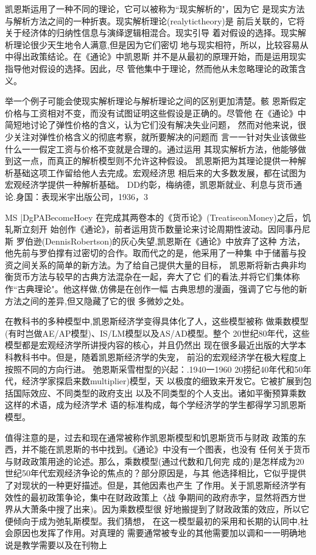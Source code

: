 凯恩斯运用了一种不同的理论，它可以被称为“现实解析的"，因为它
是现实方法与解析方法之间的一种折衷。现实解析理论(realytictheory)是
前后关联的，它将关于经济体的归纳性信息与演绎逻辑相混合。现实引导
着对假设的选择。现实解析理论很少天生地令人满意,但是因为它们密切
地与现实相符，所以，比较容易从中得出政策结论。在《通论》中凯恩斯
并不是从最初的原理开始，而是运用现实指导他对假设的选择。因此，尽
管他集中于理论，然而他从未忽略理论的政策含义。

举一个例子可能会使现实解析理论与解析理论之间的区别更加清楚。骸
恩斯假定价格与工资相对不变，而没有试图证明这些假设是正确的。尽管他
在《通论》中简短地讨论了弹性价格的含义，认为它们没有解决失业问题，
然而对他来说，很少关注对弹性价格含义的彻底考察，就所要解决的问题而
言一一针对失业该做些什么一一假定工资与价格不变就是合理的。通过运用
其现实解析方法，他能够做到这一点，而真正的解析模型则不允许这种假设。
凯恩斯把为其理论提供一种解析基础这项工作留给他人去完成。宏观经济思
相后来的大多数发展，都在试图为宏观经济学提供一种解析基础。
DD约彰，梅纳德，凯恩斯就业、利息与货币通论.身国：表现米宇出版公司，1936，3

MS
|DgPABecomeHoey
在完成其两卷本的《货币论》(TreatiseonMoney)之后，饥轧斯立刻开
始创作《通论》，前者运用货币数量论来讨论周期性波动。因同事丹尼斯
罗伯逊(DennisRobertson)的灰心失望,凯恩斯在《通论》中放弃了这种
方法，他先前与罗伯撑有过密切的合作。取而代之的是，他采用了一种集
中于储蓄与投资之间关系的简单的新方法。为了给自己提供大量的目标，
凯恩斯将新古典非均衡货币方法与较早的古典方法混杂在一起，奔大了它
们的看法,并将它们集体称作“古典理论"。他这样做,仿佛是在创作一幅
古典思想的漫画，强调了它与他的新方法之间的差异,但又隐藏了它的很
多微妙之处。

在教科书的多种模型中,凯恩斯经济学变得具体化了人，这些模型被称
做乘数模型(有时岂做AE/AP模型)、IS/LM模型以及AS/AD模型。整个
20世纪80年代，这些模型都是宏观经济学所讲授内容的核心，并且仍然出
现在很多最近出版的大学本科教科书中。但是，随着凯恩斯经济学的失宠，
前沿的宏观经济学在极大程度上按照不同的方向行进。
弛恩斯采雪柑型的兴起：.1940一1960
20捞纪40年代和50年代，经济学家探启来数multiplier)模型，天
以极度的细致来开发它。它被扩展到包括国际效应、不同类型的政府支出
以及不同类型的个人支出。诸如平衡预算乘数这样的术语，成为经济学术
语的标准构成，每个学经济学的学生都得学习凯恩斯模型。

值得注意的是，过去和现在通常被称作凯恩斯模型和饥恩斯货币与财政
政策的东西，并不能在凯恩斯的书中找到。《通论》中没有一个图表，也没有
任何关于货币与财政政策用途的论述。那么，乘数模型(通过代数和几何完
成的)是怎样成为20世纪50年代宏观经济争论的焦点的？部分原因是，与其
他选择相比，它似乎提供了对现状的一种更好描述。但是，其他因素也产生
了作用。关于凯恩斯经济学有效性的最初政策争论，集中在财政政策上〈战
争期间的政府赤字，显然将西方世界从大萧条中搜了出来)。因为乘数模型很
好地搬提到了财政政策的效应，所以它便倾向于成为弛轧斯模型。我们猜想，
在这一模型最初的采用和长期的认同中,社会原因也发挥了作用。对真理的
需要通常被专业的其他需要加以调和一一明确地说是教学需要以及在刊物上

